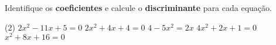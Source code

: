 \begin{question} 
    Identifique os \textbf{coeficientes} e calcule o \textbf{discriminante} para cada equação.
\begin{tasks}(2)
        \task $2x^2-11x+5=0$
        \task $2x^2+4x+4=0$
        \task $4-5x^2=2x$
        \task $4x^2+2x+1=0$
        \task $x^2+8x+16=0$
    \end{tasks}
\end{question}